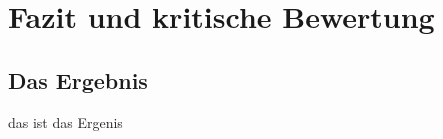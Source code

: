 \chapter{Fazit und kritische Bewertung}
\label{cha:Fazit}

\section{Das Ergebnis}
\label{sec:Ergebnis}
das ist das Ergenis 
